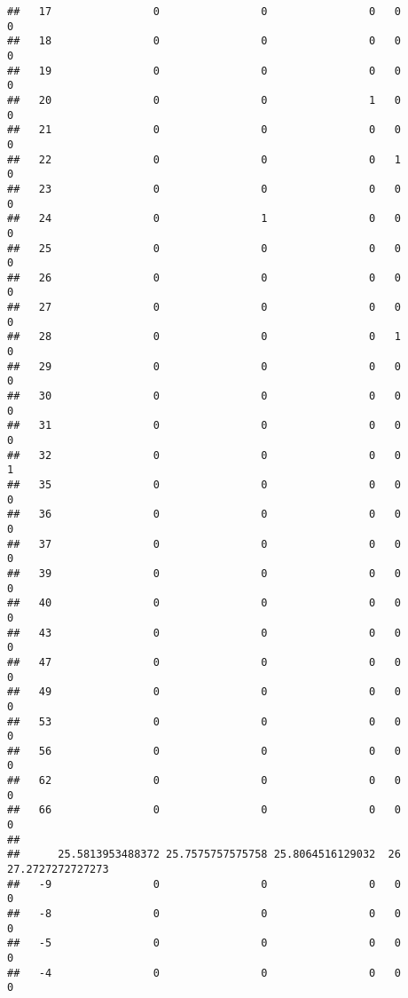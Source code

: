 \documentclass[]{article}
\begin{document}
\begin{verbatim}
##   17                0                0                0   0                0
##   18                0                0                0   0                0
##   19                0                0                0   0                0
##   20                0                0                1   0                0
##   21                0                0                0   0                0
##   22                0                0                0   1                0
##   23                0                0                0   0                0
##   24                0                1                0   0                0
##   25                0                0                0   0                0
##   26                0                0                0   0                0
##   27                0                0                0   0                0
##   28                0                0                0   1                0
##   29                0                0                0   0                0
##   30                0                0                0   0                0
##   31                0                0                0   0                0
##   32                0                0                0   0                1
##   35                0                0                0   0                0
##   36                0                0                0   0                0
##   37                0                0                0   0                0
##   39                0                0                0   0                0
##   40                0                0                0   0                0
##   43                0                0                0   0                0
##   47                0                0                0   0                0
##   49                0                0                0   0                0
##   53                0                0                0   0                0
##   56                0                0                0   0                0
##   62                0                0                0   0                0
##   66                0                0                0   0                0
##     
##      25.5813953488372 25.7575757575758 25.8064516129032  26 27.2727272727273
##   -9                0                0                0   0                0
##   -8                0                0                0   0                0
##   -5                0                0                0   0                0
##   -4                0                0                0   0                0

\end{verbatim}
\end{document}
